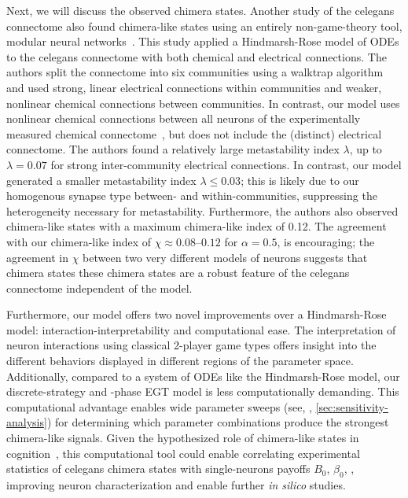 \documentclass[10pt,letterpaper]{article}
\begin{document}
Next, we will discuss the observed chimera states.
Another study of the \gls{celegans} connectome also found
chimera-like states using an entirely non-game-theory tool,
modular neural networks~\cite{hizanidis2016chimera}.
This study applied a Hindmarsh-Rose model of ODEs to the \gls{celegans}
connectome with both chemical and electrical connections.
The authors split the connectome into six communities
using a walktrap algorithm
and used strong, linear electrical connections within communities
and weaker, nonlinear chemical connections between communities.
In contrast, our model uses nonlinear chemical connections between all
neurons of the experimentally measured chemical
connectome~\cite{cook2019whole}, but does not include the
(distinct) electrical connectome.
The authors found a relatively large metastability index $\lambda$,
up to $\lambda = 0.07$ for strong inter-community electrical
connections.
In contrast,
our model generated a smaller metastability index
$\lambda \le 0.03$;
this is likely due to our homogenous synapse type between-
and within-communities, suppressing the heterogeneity necessary for
metastability.
Furthermore,
the authors also observed chimera-like states
with a maximum chimera-like index of \num{0.12}.
The agreement with our chimera-like index of
$\chi \approx \numrange{0.08}{0.12}$
for $\alpha = 0.5$,
is encouraging;
the agreement in $\chi$ between two very different models of neurons
suggests that chimera states
these chimera states are a robust feature of the \gls{celegans}
connectome independent of the model.

Furthermore, our model offers two novel improvements over a
Hindmarsh-Rose model: interaction-interpretability
and computational ease.
The interpretation of neuron interactions
using classical 2-player game types offers
insight into the different behaviors displayed in different regions of
the parameter space.
Additionally,
compared to a system of ODEs like the Hindmarsh-Rose model,
our discrete-strategy and -phase EGT model
is less computationally demanding.
This computational advantage enables wide parameter sweeps
(see, \eg{}, \cref{sec:sensitivity-analysis})
for determining which parameter combinations produce the strongest
chimera-like signals.
Given the hypothesized role of chimera-like states in
cognition~\cite{santos2017chimeralike,patton2025changing},
this computational tool could enable correlating experimental statistics of
\gls{celegans} chimera states with single-neurons payoffs $B_0$,
$\beta_0$, \etc{}, improving neuron characterization and enable further
\textit{in silico} studies.
\end{document}
